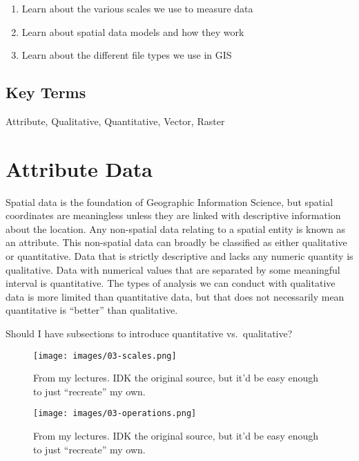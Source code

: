 \documentclass[
]{book}
\providecommand{\tightlist}{%
  \setlength{\itemsep}{0pt}\setlength{\parskip}{0pt}}
\begin{document}
\begin{enumerate}
\def\labelenumi{\arabic{enumi}.}
\tightlist
\item
  Learn about the various scales we use to measure data
\item
  Learn about spatial data models and how they work
\item
  Learn about the different file types we use in GIS
\end{enumerate}

\hypertarget{key-terms-2}{%
\subsection*{Key Terms}\label{key-terms-2}}

Attribute, Qualitative, Quantitative, Vector, Raster

\hypertarget{attribute-data}{%
\section{Attribute Data}\label{attribute-data}}

Spatial data is the foundation of Geographic Information Science, but spatial coordinates are meaningless unless they are linked with descriptive information about the location. Any non-spatial data relating to a spatial entity is known as an attribute. This non-spatial data can broadly be classified as either qualitative or quantitative. Data that is strictly descriptive and lacks any numeric quantity is qualitative. Data with numerical values that are separated by some meaningful interval is quantitative. The types of analysis we can conduct with qualitative data is more limited than quantitative data, but that does not necessarily mean quantitative is ``better'' than qualitative.

Should I have subsections to introduce quantitative vs.~qualitative?

\begin{figure}
\centering
\texttt{[image: images/03-scales.png]}
\caption{From my lectures. IDK the original source, but it'd be easy enough to just ``recreate'' my own.}
\end{figure}

\begin{figure}
\centering
\texttt{[image: images/03-operations.png]}
\caption{From my lectures. IDK the original source, but it'd be easy enough to just ``recreate'' my own.}
\end{figure}
\end{document}
